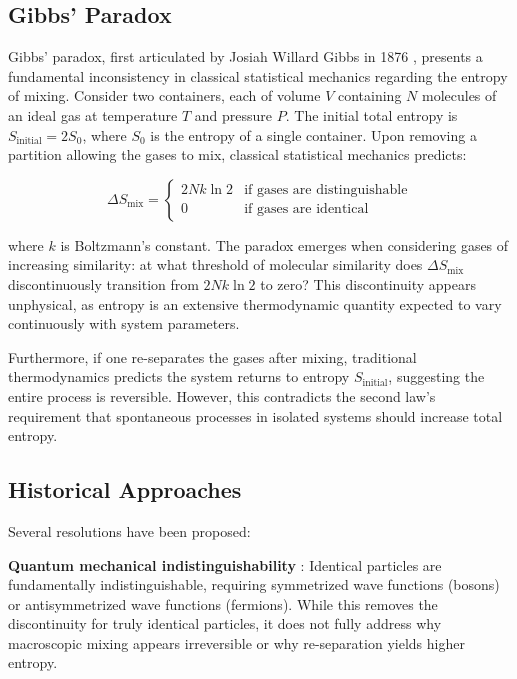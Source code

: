 \documentclass[12pt,a4paper]{article}
\theoremstyle{remark}
\begin{document}
\subsection{Gibbs' Paradox}

Gibbs' paradox, first articulated by Josiah Willard Gibbs in 1876 \cite{gibbs1876equilibrium}, presents a fundamental inconsistency in classical statistical mechanics regarding the entropy of mixing. Consider two containers, each of volume $V$ containing $N$ molecules of an ideal gas at temperature $T$ and pressure $P$. The initial total entropy is $S_\text{initial} = 2S_0$, where $S_0$ is the entropy of a single container. Upon removing a partition allowing the gases to mix, classical statistical mechanics predicts:

\begin{equation}
\Delta S_\text{mix} = 
\begin{cases}
2Nk \ln 2 & \text{if gases are distinguishable} \\
0 & \text{if gases are identical}
\end{cases}
\label{eq:gibbs_standard}
\end{equation}

where $k$ is Boltzmann's constant. The paradox emerges when considering gases of increasing similarity: at what threshold of molecular similarity does $\Delta S_\text{mix}$ discontinuously transition from $2Nk \ln 2$ to zero? This discontinuity appears unphysical, as entropy is an extensive thermodynamic quantity expected to vary continuously with system parameters.

Furthermore, if one re-separates the gases after mixing, traditional thermodynamics predicts the system returns to entropy $S_\text{initial}$, suggesting the entire process is reversible. However, this contradicts the second law's requirement that spontaneous processes in isolated systems should increase total entropy.

\subsection{Historical Approaches}

Several resolutions have been proposed:

\textbf{Quantum mechanical indistinguishability} \cite{bach1997gibbs,saunders2006gibbs}: Identical particles are fundamentally indistinguishable, requiring symmetrized wave functions (bosons) or antisymmetrized wave functions (fermions). While this removes the discontinuity for truly identical particles, it does not fully address why macroscopic mixing appears irreversible or why re-separation yields higher entropy.
\end{document}
